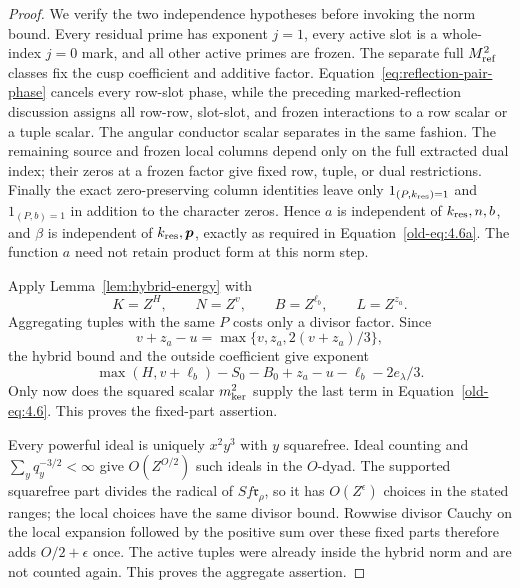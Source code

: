 \documentclass[11pt,a4paper]{article}
\numberwithin{equation}{section}
\numberwithin{figure}{section}
\theoremstyle{definition}
\theoremstyle{remark}
\begin{document}
\begin{proof}
We verify the two independence hypotheses before invoking the norm bound.
Every residual prime has exponent \(j=1\), every active slot is a whole-index
\(j=0\) mark, and all other active primes are frozen.  The separate full
\(M_{\rm ref}^2\) classes fix the cusp coefficient and additive factor.
Equation~\eqref{eq:reflection-pair-phase} cancels every row-slot phase, while
the preceding marked-reflection discussion assigns all row-row, slot-slot,
and frozen interactions to a row scalar or a tuple scalar.  The angular
conductor scalar separates in the same fashion.  The remaining source and
frozen local columns depend only on the full extracted dual index; their
zeros at a frozen factor give fixed row, tuple, or dual restrictions.
Finally the exact zero-preserving column identities leave only
\(1_{(P,k_{\rm res})=1}\) and \(1_{(P,b)=1}\) in addition to the character
zeros.  Hence \(a\) is independent of \(k_{\rm res},n,b\), and \(\beta\)
is independent of \(k_{\rm res},\boldsymbol p\), exactly as required in
Equation~\eqref{old-eq:4.6a}.  The function \(a\) need not retain product
form at this norm step.

Apply Lemma~\ref{lem:hybrid-energy} with
\[
 K=Z^H,\qquad N=Z^v,\qquad B=Z^{\ell_b},\qquad L=Z^{z_a}.
\]
Aggregating tuples with the same \(P\) costs only a divisor factor.  Since
\[
 v+z_a-u=\max\{v,z_a,2(v+z_a)/3\},
\]
the hybrid bound and the outside coefficient give exponent
\[
 \max(H,v+\ell_b)-S_0-B_0+z_a-u-\ell_b-2e_\lambda/3.
\]
Only now does the squared scalar \(m_{\rm ker}^2\) supply the last term in
Equation~\eqref{old-eq:4.6}.  This proves the fixed-part assertion.

Every powerful ideal is uniquely \(x^2y^3\) with \(y\) squarefree.  Ideal
counting and \(\sum_yq_y^{-3/2}<\infty\) give \(O(Z^{O/2})\) such ideals
in the \(O\)-dyad.  The supported squarefree part divides the radical of
\(S f\mathfrak r_\rho\), so it has \(O(Z^\epsilon)\) choices in the stated
ranges; the local choices have the same divisor bound.  Rowwise divisor
Cauchy on the local expansion followed by the positive sum over these fixed
parts therefore adds \(O/2+\epsilon\) once.  The active tuples were already
inside the hybrid norm and are not counted again.  This proves the aggregate
assertion.
\end{proof}
\end{document}
